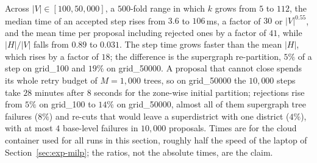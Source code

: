 \documentclass[preprint,12pt,authoryear]{elsarticle}
\theoremstyle{definition}
\begin{document}
\begin{table}[!htbp]
\centering
\small\setlength{\tabcolsep}{4pt}
\caption{Scalability sweep across the five synthetic grids, one chain of $10{,}000$ steps each. $|\mathcal{P}^1|$ is the median number of districts. The median and the $95$th percentile are over accepted steps; ``mean, all proposals'' is the wall-clock time per proposal including rejected ones. ``Supergraph share'' is the share of the step time spent re-partitioning the supergraph. Rejected steps are proposals whose recursion could not close within its retry budget or that would have violated $\kappa^2_{\min}$; they leave the state unchanged.}
\label{tab:scalability}
\end{table}

Across $|V| \in [100, 50{,}000]$, a $500$-fold range in which $k$ grows from $5$ to $112$, the median time of an accepted step rises from $3.6$ to $106$\,ms, a factor of $30$ or $|V|^{0.55}$, and the mean time per proposal including rejected ones by a factor of $41$, while $|H|/|V|$ falls from $0.89$ to $0.031$. The step time grows faster than the mean $|H|$, which rises by a factor of $18$; the difference is the supergraph re-partition, $5\%$ of a step on grid\_100 and $19\%$ on grid\_50000. A proposal that cannot close spends its whole retry budget of $M = 1{,}000$ trees, so on grid\_50000 the $10{,}000$ steps take $28$ minutes after $8$ seconds for the zone-wise initial partition; rejections rise from $5\%$ on grid\_100 to $14\%$ on grid\_50000, almost all of them supergraph tree failures ($8\%$) and re-cuts that would leave a superdistrict with one district ($4\%$), with at most $4$ base-level failures in $10{,}000$ proposals. Times are for the cloud container used for all runs in this section, roughly half the speed of the laptop of Section~\ref{sec:exp-milp}; the ratios, not the absolute times, are the claim.
\end{document}
